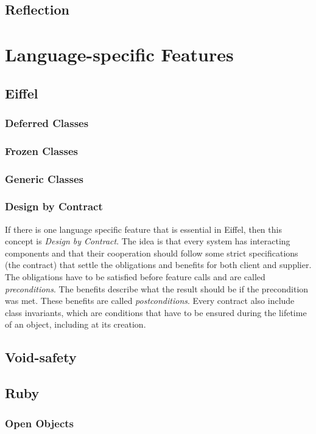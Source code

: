 \documentclass[11pt,a4paper,twocolumn]{article}
\begin{document}
\subsection{Reflection}

\section{Language-specific Features}
\subsection{Eiffel}
\subsubsection{Deferred Classes}
\subsubsection{Frozen Classes}
\subsubsection{Generic Classes}
\subsubsection{Design by Contract}
If there is one language specific feature that is essential in Eiffel, then this concept is \emph{Design by Contract}. The idea is that every system has interacting components and that their cooperation should follow some strict specifications (the contract) that settle the obligations and benefits for both client and supplier. The obligations have to be satisfied before feature calls and are called \emph{preconditions}. The benefits describe what the result should be if the precondition was met. These benefits are called \emph{postconditions}. Every contract also include class invariants, which are conditions that have to be ensured during the lifetime of an object, including at its creation.


\subsection{Void-safety}


\subsection{Ruby}
\subsubsection{Open Objects}
\end{document}
